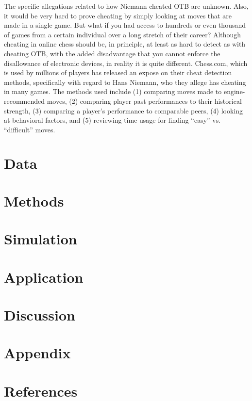 \documentclass[12pt]{article}
\begin{document}
The specific allegations related to how Niemann cheated OTB are unknown. Also, it would be very hard to prove cheating by simply looking at moves that are made in a single game. But what if you had access to hundreds or even thousand of games from a certain individual over a long stretch of their career?
Although cheating in online chess should be, in principle, at least as hard to detect as with cheating OTB, with the added disadvantage that you cannot enforce the disallowance of electronic devices, in reality it is quite different. Chess.com, which is used by millions of players has released an expose on their cheat detection methods, specifically with regard to Hans Niemann, who they allege has cheating in many games. The methods used include (1) comparing moves made to engine-recommended moves, (2) comparing player past performances to their historical strength, (3) comparing a player's performance to comparable peers, (4) looking at behavioral factors, and (5) reviewing time usage for finding “easy” vs. “difficult” moves.  

\section*{Data}
\label{sec:data}


\section*{Methods}
\label{sec:meth}

\section*{Simulation}
\label{sec:sim}


\section*{Application}
\label{sec:app}

\section*{Discussion}
\label{sec:disc}

\section*{Appendix}
\label{sec:appx}

\section*{References}
\label{sec:refs}
\end{document}
